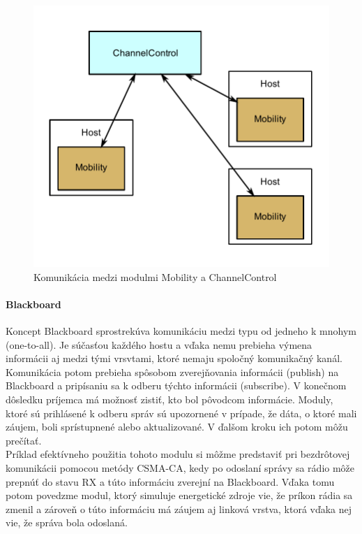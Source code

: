\begin{figure}[htbp]
\begin{center}
\includegraphics[width=120mm]{figures/topology_mobility}
\caption{Komunikácia medzi modulmi \ttfamily Mobility \rmfamily a \ttfamily ChannelControl\rmfamily}
\label{fig:topology_mobility}
\end{center}
\end{figure}

\paragraph{Blackboard}
\indent Koncept Blackboard sprostrekúva komunikáciu medzi typu od jedneho k mnohym (one-to-all). Je súčasťou každého hostu a vďaka nemu prebieha výmena informácii aj medzi tými vrsvtami, ktoré nemaju spoločný komunikačný kanál. Komunikácia potom prebieha spôsobom zverejňovania informácii (publish) na Blackboard a pripísaniu sa k odberu týchto informácii (subscribe). V konečnom dôsledku príjemca má možnosť zistiť, kto bol pôvodcom informácie. Moduly, ktoré sú prihlásené k odberu správ sú upozornené v prípade, že dáta, o ktoré mali záujem, boli sprístupnené alebo aktualizované. V ďalšom kroku ich potom môžu prečítať.\\
\indent Príklad efektívneho použitia tohoto modulu si môžme predstaviť pri bezdrôtovej komunikácii pomocou metódy CSMA-CA, kedy po odoslaní správy sa rádio môže prepnúť do stavu RX a túto informáciu zverejní na Blackboard. Vďaka tomu potom povedzme modul, ktorý simuluje energetické zdroje vie, že príkon rádia sa zmenil a zároveň o túto informáciu má záujem aj linková vrstva, ktorá vďaka nej vie, že správa bola odoslaná.\\

